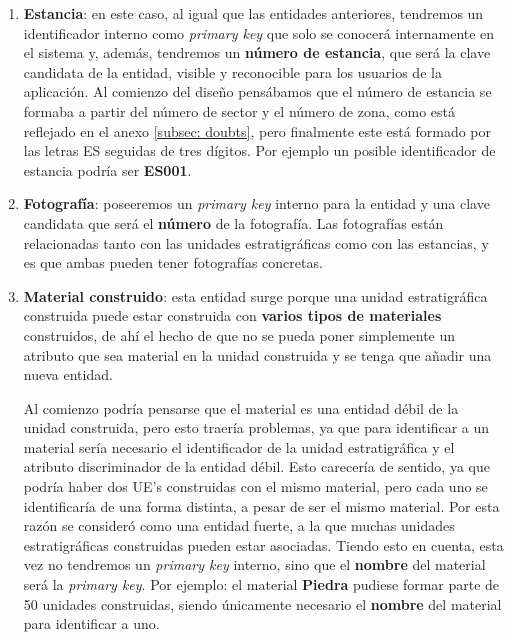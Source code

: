 \begin{enumerate}
        \item \textbf{\gls{Estancia}}: en este caso, al igual que las entidades anteriores,
        tendremos un identificador interno como \textit{primary key} que solo se conocerá
        internamente en el sistema y, además, tendremos un \textbf{número de estancia}, que será
        la clave candidata de la entidad, visible y reconocible para los usuarios de la aplicación.
        Al comienzo del diseño pensábamos que el número de estancia se formaba a partir del número
        de sector y el número de zona, como está reflejado en el anexo \ref{subsec: doubts},
        pero finalmente este está formado por las letras ES seguidas de tres dígitos. Por ejemplo
        un posible identificador de estancia podría ser \textbf{ES001}.

        \item \textbf{Fotografía}: poseeremos un \textit{primary key} interno para la entidad y una
        clave candidata que será el \textbf{número} de la fotografía. Las fotografías están
        relacionadas tanto con las unidades estratigráficas como con las estancias, y es que 
        ambas pueden tener fotografías concretas.
        
        \item \textbf{Material construido}: esta entidad surge porque una unidad estratigráfica
        construida puede estar construida con \textbf{varios tipos de materiales} construidos,
        de ahí el hecho de que no se pueda poner simplemente un atributo que sea material en
        la unidad construida y se tenga que añadir una nueva entidad.

        Al comienzo podría pensarse que el material es una entidad débil de la unidad
        construida, pero esto traería problemas, ya que para identificar a un material sería
        necesario el identificador de la unidad estratigráfica y el atributo discriminador de
        la entidad débil. Esto carecería de sentido, ya que podría haber dos UE's construidas
        con el mismo material, pero cada uno se identificaría de una forma distinta, a pesar
        de ser el mismo material. Por esta razón se consideró como una entidad fuerte, a la
        que muchas unidades estratigráficas construidas pueden estar asociadas. Tiendo esto
        en cuenta, esta vez no tendremos un \textit{primary key} interno, sino que el
        \textbf{nombre} del material será la \textit{primary key}. Por ejemplo: el material
        \textbf{Piedra} pudiese formar parte de 50 unidades construidas, siendo únicamente
        necesario el \textbf{nombre} del material para identificar a uno.
        

\end{enumerate}
